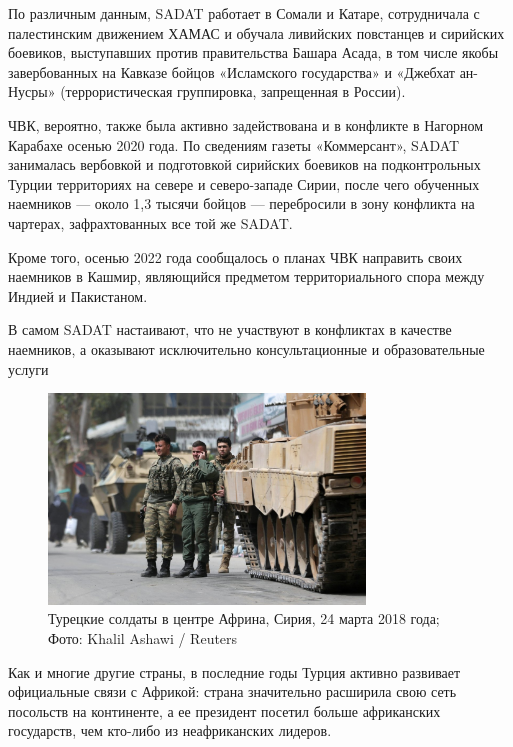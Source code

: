 По различным данным, SADAT работает в Сомали и Катаре, сотрудничала с палестинским движением ХАМАС и обучала ливийских повстанцев и сирийских боевиков, выступавших против правительства Башара Асада, в том числе якобы завербованных на Кавказе бойцов «Исламского государства» и «Джебхат ан-Нусры» (террористическая группировка, запрещенная в России).

ЧВК, вероятно, также была активно задействована и в конфликте в Нагорном Карабахе осенью 2020 года. По сведениям газеты «Коммерсант», SADAT занималась вербовкой и подготовкой сирийских боевиков на подконтрольных Турции территориях на севере и северо-западе Сирии, после чего обученных наемников — около 1,3 тысячи бойцов — перебросили в зону конфликта на чартерах, зафрахтованных все той же SADAT.

Кроме того, осенью 2022 года сообщалось о планах ЧВК направить своих наемников в Кашмир, являющийся предметом территориального спора между Индией и Пакистаном.

\begin{center}
    \Large
    В самом SADAT настаивают, что не участвуют в конфликтах в качестве наемников, а оказывают исключительно консультационные и образовательные услуги
\end{center}


\begin{figure}[h]
    \centering
    \includegraphics[width=0.75\textwidth]{img/pmc_africa_8.jpg}
    \caption{Турецкие солдаты в центре Африна, Сирия, 24 марта 2018 года; Фото: Khalil Ashawi / Reuters}
\end{figure}

Как и многие другие страны, в последние годы Турция активно развивает официальные связи с Африкой: страна значительно расширила свою сеть посольств на континенте, а ее президент посетил больше африканских государств, чем кто-либо из неафриканских лидеров.

